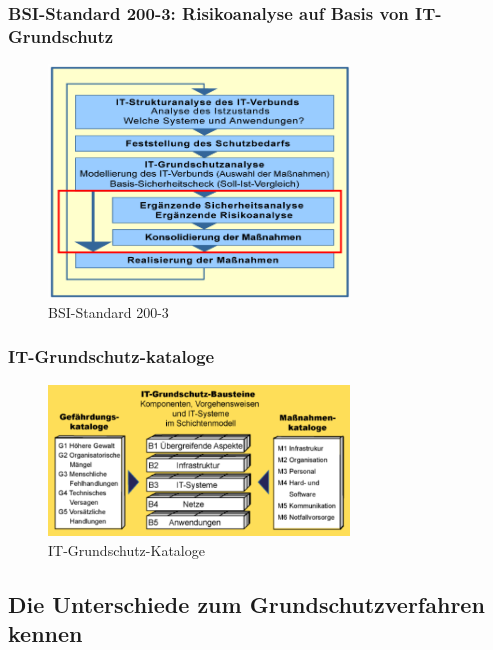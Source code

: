 \documentclass[10pt,a4paper]{article}
\begin{document}
\subsubsection*{BSI-Standard 200-3: Risikoanalyse auf Basis von IT-Grundschutz}
\begin{figure}[H]
    \begin{center}
    \includegraphics[width=8cm]{images/BSI200-3.png}
    \caption{BSI-Standard 200-3}
    \label{BSI-Standard 200-3}
    \end{center}
\end{figure}

\subsubsection*{IT-Grundschutz-kataloge}
\begin{figure}[H]
    \begin{center}
    \includegraphics[width=8cm]{images/IT-Grundschutz-Kataloge.png}
    \caption{IT-Grundschutz-Kataloge}
    \label{IT-Grundschutz-Kataloge}
    \end{center}
\end{figure}


\subsection*{Die Unterschiede zum Grundschutzverfahren kennen}
\end{document}
